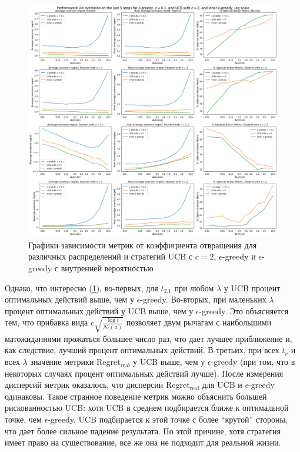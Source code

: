 \begin{figure}[ht!] %
\centering
\includegraphics[width=6in]{Figures/experiments_aversion/ucb/last_5_steps.png}
\caption{Графики зависимости метрик от коэффициента отвращения для различных распределений и стратегий UCB с $c=2$, $\epsilon$-greedy и $\epsilon$-greedy с внутренней вероятностью}
\label{fig:ucb_compare_ucb_for_different_aversions}
\end{figure}

Однако, что интересно (\ref{fig:ucb_compare_ucb_for_different_aversions}), во-первых, для $t_{2.1}$ при любом $\lambda$ у UCB процент оптимальных действий выше, чем у $\epsilon$-greedy. Во-вторых, при маленьких $\lambda$ процент оптимальных действий у UCB выше, чем у $\epsilon$-greedy. Это объясняется тем, что прибавка вида $c\sqrt{\frac{\log t}{N_t(a)}}$ позволяет двум рычагам с наибольшими матожиданиями прожаться большее число раз, что дает лучшее приближение и, как следствие, лучший процент оптимальных действий. В-третьих, при всех $t_{\nu}$ и всех $\lambda$ значение метрики Regret$_{\text{real}}$ у UCB выше, чем у $\epsilon$-greedy (при том, что в некоторых случаях процент оптимальных действий лучше). После измерения дисперсий метрик оказалось, что дисперсии Regret$_{\text{real}}$ для UCB и $\epsilon$-greedy одинаковы. Такое странное поведение метрик можно объяснить большей рискованностью UCB: хотя UCB в среднем подбирается ближе к оптимальной точке, чем $\epsilon$-greedy, UCB подбирается к этой точке с более ``крутой'' стороны, что дает более сильное падение результата. По этой причине, хотя стратегия имеет право на существование, все же она не подходит для реальной жизни.

